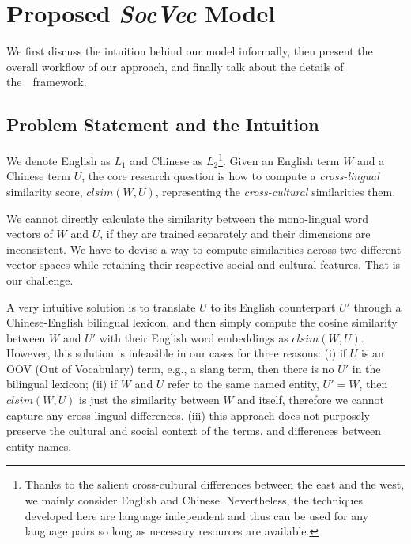 \section{Proposed \textit{SocVec} Model}
\label{sec:socvec}
We first discuss the intuition behind our model informally, then present the overall workflow of our approach, and finally talk about the details of the~\textit{\socvec}~framework.

\subsection{Problem Statement and the Intuition}
We denote English as $L_1$ and Chinese as $L_2$\footnote{Thanks to the salient cross-cultural differences between the east and the west, 
we mainly consider English and Chinese. 
Nevertheless, the techniques developed here are language independent and 
thus can be used for any language pairs so long as 
necessary resources are available.}.
Given an English term $W$ and a Chinese term $U$,
the core research question is 
how to compute a \textit{cross-lingual} similarity score, $clsim(W, U)$, representing the \textit{cross-cultural} 
similarities them. 

We cannot directly calculate 
the similarity between the mono-lingual word vectors of $W$ and $U$, 
if they are trained separately and their dimensions 
are inconsistent.
We have to devise a way to compute 
similarities across two different vector spaces while retaining 
their respective social and cultural features.
That is our challenge. 

A very intuitive solution is to translate $U$ to its English 
counterpart $U'$ through a Chinese-English bilingual lexicon, and then simply compute 
the cosine similarity between $W$ and $U'$ with their English word embeddings as $clsim(W, U)$.
However, this solution is infeasible in our cases for three reasons: 
(i) if $U$ is an OOV (Out of Vocabulary) term, e.g., a slang term, 
then there is no $U'$ in the bilingual lexicon; 
(ii) if $W$ and $U$ refer to the same named entity, $U' = W$, 
then $clsim(W, U)$ is just the similarity between $W$ and itself, 
therefore we cannot capture any cross-lingual differences. 
(iii) this approach does not purposely preserve the 
cultural and social context of the terms. 
and differences between entity names.

